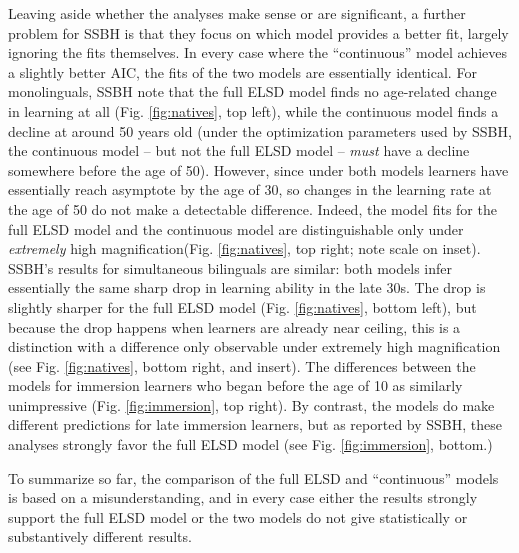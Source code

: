 \documentclass[
  english,
  doc,floatsintext]{apa6}
\begin{document}
Leaving aside whether the analyses make sense or are significant, a further problem for SSBH is that they focus on which model provides a better fit, largely ignoring the fits themselves. In every case where the ``continuous'' model achieves a slightly better AIC, the fits of the two models are essentially identical. For monolinguals, SSBH note that the full ELSD model finds no age-related change in learning at all (Fig. \ref{fig:natives}, top left), while the continuous model finds a decline at around 50 years old (under the optimization parameters used by SSBH, the continuous model -- but not the full ELSD model -- \emph{must} have a decline somewhere before the age of 50). However, since under both models learners have essentially reach asymptote by the age of 30, so changes in the learning rate at the age of 50 do not make a detectable difference. Indeed, the model fits for the full ELSD model and the continuous model are distinguishable only under \emph{extremely} high magnification(Fig. \ref{fig:natives}, top right; note scale on inset). SSBH's results for simultaneous bilinguals are similar: both models infer essentially the same sharp drop in learning ability in the late 30s. The drop is slightly sharper for the full ELSD model (Fig. \ref{fig:natives}, bottom left), but because the drop happens when learners are already near ceiling, this is a distinction with a difference only observable under extremely high magnification (see Fig. \ref{fig:natives}, bottom right, and insert). The differences between the models for immersion learners who began before the age of 10 as similarly unimpressive (Fig. \ref{fig:immersion}, top right). By contrast, the models do make different predictions for late immersion learners, but as reported by SSBH, these analyses strongly favor the full ELSD model (see Fig. \ref{fig:immersion}, bottom.)

To summarize so far, the comparison of the full ELSD and ``continuous'' models is based on a misunderstanding, and in every case either the results strongly support the full ELSD model or the two models do not give statistically or substantively different results.
\end{document}
